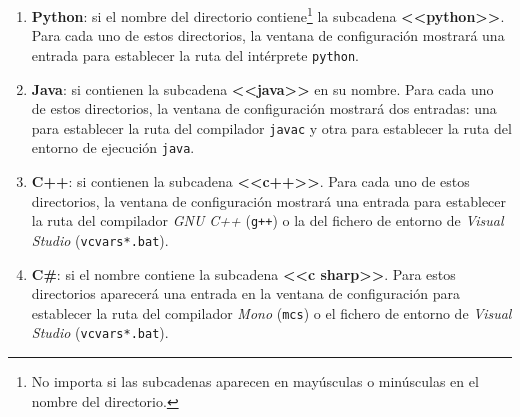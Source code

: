 \documentclass[]{article}
\newcommand{\code}[1]{{\lstinline[basicstyle=\ttfamily,mathescape]!#1!}}
\begin{document}
\begin{enumerate}
  \item \textbf{Python}: si el nombre del directorio contiene\footnote{No importa si las subcadenas aparecen en mayúsculas o minúsculas en el nombre del directorio.} la subcadena \textbf{<<python>>}. Para cada uno de estos directorios, la ventana de configuración mostrará una entrada para establecer la ruta del intérprete \code{python}.
  \item \textbf{Java}: si contienen la subcadena \textbf{<<java>>} en su nombre. Para cada uno de estos directorios, la ventana de configuración mostrará dos entradas: una para establecer la ruta del compilador \code{javac} y otra para establecer la ruta del entorno de ejecución \code{java}.
  \item \textbf{C++}: si contienen la subcadena \textbf{<<c++>>}. Para cada uno de estos directorios, la ventana de configuración mostrará una entrada para establecer la ruta del compilador \emph{GNU C++} (\code{g++}) o la del fichero de entorno de \emph{Visual Studio} (\code{vcvars*.bat}). 
  \item \textbf{C\#}: si el nombre contiene la subcadena \textbf{<<c sharp>>}. Para estos directorios aparecerá una entrada en la ventana de configuración para establecer la ruta del compilador \emph{Mono} (\code{mcs}) o el fichero de entorno de \emph{Visual Studio} (\code{vcvars*.bat}).
\end{enumerate}
\end{document}
